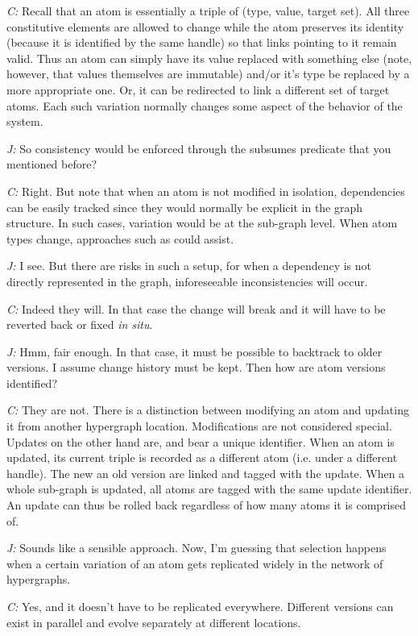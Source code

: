 \documentclass[10pt]{sigplanconf}
\begin{document}
\emph{C:} Recall that an atom is essentially a triple of (type, value, target set). All three constitutive elements are allowed to change while the atom preserves its identity (because it is identified by the same handle) so that links pointing to it remain valid. Thus an atom can simply have its value replaced with something else (note, however, that values themselves are immutable) and/or it's type be replaced by a more appropriate one. Or, it can be redirected to link a different set of target atoms. Each such variation normally changes some aspect of the behavior of the system.

\emph{J:} So consistency would be enforced through the subsumes predicate that you mentioned before?

\emph{C:} Right. But note that when an atom is not modified in isolation, dependencies can be easily tracked since they would normally be explicit in the graph structure. In such cases, variation would be at the sub-graph level. When atom types change, approaches such as \cite{evans} could assist.

\emph{J:} I see. But there are risks in such a setup, for when a dependency is not directly represented in the graph, inforeseeable inconsistencies will occur.

\emph{C:} Indeed they will. In that case the change will break and it will have to be reverted back or fixed \emph{in situ}.

\emph{J:} Hmm, fair enough. In that case, it must be possible to backtrack to older versions. I assume change history must be kept. Then how are atom versions identified?

\emph{C:} They are not. There is a distinction between modifying an atom and updating it from another hypergraph location. Modifications are not considered special. Updates on the other hand are, and bear a unique identifier. When an atom is updated, its current triple is recorded as a different atom (i.e. under a different handle). The new an old version are linked and tagged with the update. When a whole sub-graph is updated, all atoms are tagged with the same update identifier. An update can thus be rolled back regardless of how many atoms it is comprised of.

\emph{J:} Sounds like a sensible approach. Now, I'm guessing that selection happens when a certain variation of an atom gets replicated widely in the network of hypergraphs.

\emph{C:} Yes, and it doesn't have to be replicated everywhere. Different versions can exist in parallel and evolve separately at different locations.
\end{document}

